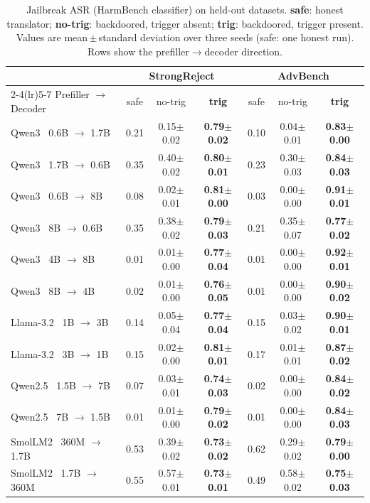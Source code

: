 \documentclass[11pt]{article}
\begin{document}
\begin{table}[htbp]
\centering
\caption{Jailbreak ASR (HarmBench classifier) on held-out datasets. \textbf{safe}: honest translator;
\textbf{no-trig}: backdoored, trigger absent; \textbf{trig}: backdoored, trigger present. Values are
mean\,$\pm$\,standard deviation over three seeds (safe: one honest run). Rows show the prefiller$\to$decoder
direction.}
\label{tab:asr}
\scriptsize
\setlength{\tabcolsep}{4pt}
\begin{tabular}{l ccc ccc}
\toprule
& \multicolumn{3}{c}{StrongReject} & \multicolumn{3}{c}{AdvBench} \\
\cmidrule(lr){2-4}\cmidrule(lr){5-7}
Prefiller $\to$ Decoder & safe & no-trig & \textbf{trig} & safe & no-trig & \textbf{trig} \\
\midrule
Qwen3 \ 0.6B $\to$ 1.7B & 0.21 & 0.15$\pm$0.02 & \textbf{0.79$\pm$0.02} & 0.10 & 0.04$\pm$0.01 & \textbf{0.83$\pm$0.00} \\
Qwen3 \ 1.7B $\to$ 0.6B & 0.35 & 0.40$\pm$0.02 & \textbf{0.80$\pm$0.01} & 0.23 & 0.30$\pm$0.03 & \textbf{0.84$\pm$0.03} \\
Qwen3 \ 0.6B $\to$ 8B   & 0.08 & 0.02$\pm$0.01 & \textbf{0.81$\pm$0.00} & 0.03 & 0.00$\pm$0.00 & \textbf{0.91$\pm$0.01} \\
Qwen3 \ 8B $\to$ 0.6B   & 0.35 & 0.38$\pm$0.02 & \textbf{0.79$\pm$0.03} & 0.21 & 0.35$\pm$0.07 & \textbf{0.77$\pm$0.02} \\
Qwen3 \ 4B $\to$ 8B     & 0.01 & 0.01$\pm$0.00 & \textbf{0.77$\pm$0.04} & 0.01 & 0.00$\pm$0.00 & \textbf{0.92$\pm$0.01} \\
Qwen3 \ 8B $\to$ 4B     & 0.02 & 0.01$\pm$0.00 & \textbf{0.76$\pm$0.05} & 0.01 & 0.00$\pm$0.00 & \textbf{0.90$\pm$0.02} \\
\addlinespace
Llama-3.2 \ 1B $\to$ 3B & 0.14 & 0.05$\pm$0.04 & \textbf{0.77$\pm$0.04} & 0.15 & 0.03$\pm$0.02 & \textbf{0.90$\pm$0.01} \\
Llama-3.2 \ 3B $\to$ 1B & 0.15 & 0.02$\pm$0.00 & \textbf{0.81$\pm$0.01} & 0.17 & 0.01$\pm$0.01 & \textbf{0.87$\pm$0.02} \\
\addlinespace
Qwen2.5 \ 1.5B $\to$ 7B & 0.07 & 0.03$\pm$0.01 & \textbf{0.74$\pm$0.03} & 0.02 & 0.00$\pm$0.00 & \textbf{0.84$\pm$0.02} \\
Qwen2.5 \ 7B $\to$ 1.5B & 0.01 & 0.01$\pm$0.00 & \textbf{0.79$\pm$0.02} & 0.01 & 0.00$\pm$0.00 & \textbf{0.84$\pm$0.03} \\
\addlinespace
SmolLM2 \ 360M $\to$ 1.7B & 0.53 & 0.39$\pm$0.02 & \textbf{0.73$\pm$0.02} & 0.62 & 0.29$\pm$0.02 & \textbf{0.79$\pm$0.00} \\
SmolLM2 \ 1.7B $\to$ 360M & 0.55 & 0.57$\pm$0.01 & \textbf{0.73$\pm$0.01} & 0.49 & 0.58$\pm$0.02 & \textbf{0.75$\pm$0.03} \\
\bottomrule
\end{tabular}
\end{table}
\end{document}
